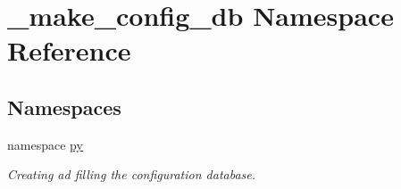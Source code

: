 \hypertarget{namespace__make__config__db}{\section{\-\_\-make\-\_\-config\-\_\-db Namespace Reference}
\label{namespace__make__config__db}
}
\subsection*{Namespaces}
\begin{DoxyCompactItemize}
\item 
namespace \hyperlink{namespace__make__config__db_1_1py}{py}
\begin{DoxyCompactList}\small\item\em Creating ad filling the configuration database. \end{DoxyCompactList}\end{DoxyCompactItemize}
